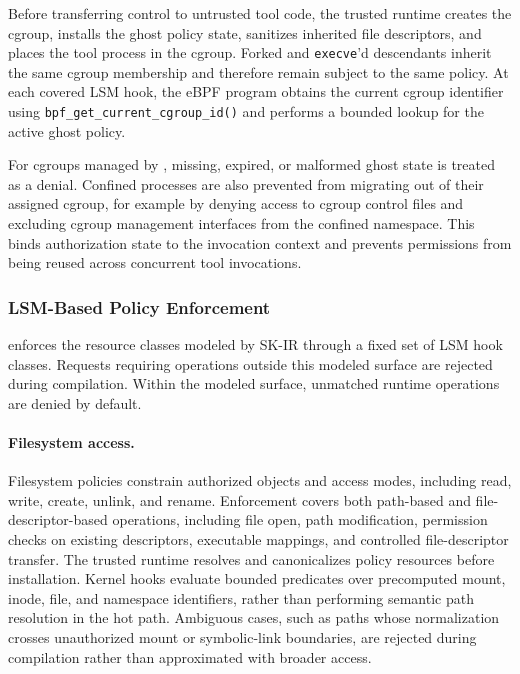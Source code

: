 Before transferring control to untrusted tool code, the trusted runtime creates
the cgroup, installs the ghost policy state, sanitizes inherited file
descriptors, and places the tool process in the cgroup. Forked and
\texttt{execve}'d descendants inherit the same cgroup membership and therefore
remain subject to the same policy. At each covered LSM hook, the eBPF program
obtains the current cgroup identifier using
\texttt{bpf\_get\_current\_cgroup\_id()} and performs a bounded lookup for the
active ghost policy.

For cgroups managed by \SystemName, missing, expired, or malformed ghost state
is treated as a denial. Confined processes are also prevented from migrating out
of their assigned cgroup, for example by denying access to cgroup control files
and excluding cgroup management interfaces from the confined namespace. This
binds authorization state to the invocation context and prevents permissions
from being reused across concurrent tool invocations.

\subsubsection{LSM-Based Policy Enforcement}
\label{sec:design:ebpf:hooks}

\SystemName enforces the resource classes modeled by SK-IR through a fixed set
of LSM hook classes. Requests requiring operations outside this modeled surface
are rejected during compilation. Within the modeled surface, unmatched runtime
operations are denied by default.

\paragraph{Filesystem access.}
Filesystem policies constrain authorized objects and access modes, including
read, write, create, unlink, and rename. Enforcement covers both path-based and
file-descriptor-based operations, including file open, path modification,
permission checks on existing descriptors, executable mappings, and controlled
file-descriptor transfer. The trusted runtime resolves and canonicalizes policy
resources before installation. Kernel hooks evaluate bounded predicates over
precomputed mount, inode, file, and namespace identifiers, rather than
performing semantic path resolution in the hot path. Ambiguous cases, such as
paths whose normalization crosses unauthorized mount or symbolic-link
boundaries, are rejected during compilation rather than approximated with
broader access.

